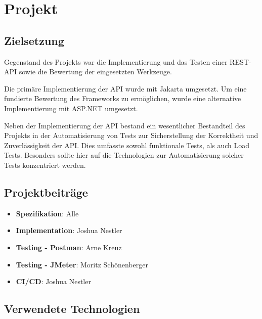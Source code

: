 \chapter{Projekt}

\section{Zielsetzung}

Gegenstand des Projekts war die Implementierung und das Testen einer REST-API sowie die Bewertung der eingesetzten Werkzeuge.

Die primäre Implementierung der API wurde mit Jakarta umgesetzt.
Um eine fundierte Bewertung des Frameworks zu ermöglichen, 
wurde eine alternative Implementierung mit ASP.NET umgesetzt.

Neben der Implementierung der API bestand ein wesentlicher Bestandteil des Projekts 
in der Automatisierung von Tests zur Sicherstellung der Korrektheit und Zuverlässigkeit der API.
Dies umfasste sowohl funktionale Tests, als auch Load Tests. 
Besonders sollte hier auf die Technologien zur Automatisierung solcher Tests konzentriert werden.

    

\section{Projektbeiträge}

\begin{itemize}
    \item \textbf{Spezifikation}: Alle
    \item \textbf{Implementation}: Joshua Nestler
    \item \textbf{Testing - Postman}: Arne Kreuz
    \item \textbf{Testing - JMeter}: Moritz Schönenberger
    \item \textbf{CI/CD}: Joshua Nestler
\end{itemize}

\section{Verwendete Technologien}

